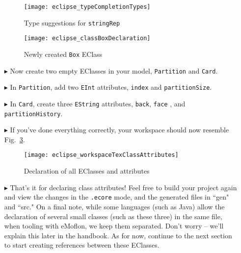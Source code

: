\begin{itemize}
\newpage

\begin{figure}[htbp]
	\centering
  \texttt{[image: eclipse\_typeCompletionTypes]}
	\caption{Type suggestions for \texttt{stringRep}}
	\label{eclipse:typeCompTypes}
\end{figure} 

\vspace{0.5cm}

\begin{figure}[htbp]
	\centering
  \texttt{[image: eclipse\_classBoxDeclaration]}
	\caption{Newly created \texttt{Box} EClass}
	\label{eclipse:boxDeclaration}
\end{figure} 
\FloatBarrier

\vspace{0.5cm}

\item[$\blacktriangleright$] Now create two empty EClasses in your model, \texttt{Partition} and \texttt{Card}.

\vspace{0.5cm}

\item[$\blacktriangleright$] In \texttt{Partition}, add two \texttt{EInt} attributes, \texttt{index} and \texttt{partitionSize}.

\vspace{0.5cm}

\item[$\blacktriangleright$] In \texttt{Card}, create three \texttt{EString} attributes, \texttt{back}, \texttt{face} , and \texttt{part\-it\-ion\-His\-tory}.

\item[$\blacktriangleright$] If you've done everything correctly, your workspace should now resemble Fig.~\ref{eclipse:workspaceClassAttributes}.

\begin{figure}[htbp]
	\centering
  \texttt{[image: eclipse\_workspaceTexClassAttributes]}
	\caption{Declaration of all EClasses and attributes}
	\label{eclipse:workspaceClassAttributes}
\end{figure} 

\vspace{0.5cm}

\item[$\blacktriangleright$] That's it for declaring class attributes! Feel free to build your project again and view the changes in the \texttt{.ecore}
mode, and the generated files in ``gen" and ``src." On a final note, while some languages (such as Java) allow the declaration of several small classes (such as
these three) in the same file, when tooling with eMoflon, we keep them separated. Don't worry -- we'll explain this later in the handbook. As for now, continue
to the next section to start creating references between these EClasses.

\end{itemize}
